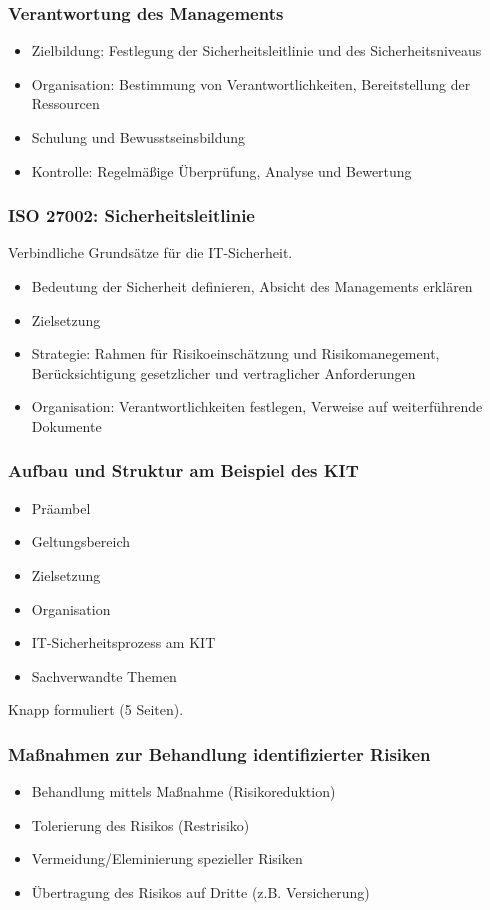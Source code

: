 \subsubsection{Verantwortung des Managements}
\begin{itemize}
	\item Zielbildung: Festlegung der Sicherheitsleitlinie und des Sicherheitsniveaus
	\item Organisation: Bestimmung von Verantwortlichkeiten, Bereitstellung der Ressourcen
	\item Schulung und Bewusstseinsbildung
	\item Kontrolle: Regelmäßige Überprüfung, Analyse und Bewertung
\end{itemize}

\subsubsection{ISO 27002: Sicherheitsleitlinie}
Verbindliche Grundsätze für die IT-Sicherheit.
\begin{itemize}
	\item Bedeutung der Sicherheit definieren, Absicht des Managements erklären
	\item Zielsetzung
	\item Strategie: Rahmen für Risikoeinschätzung und Risikomanegement, Berücksichtigung gesetzlicher und vertraglicher Anforderungen
	\item Organisation: Verantwortlichkeiten festlegen, Verweise auf weiterführende Dokumente
\end{itemize}

\subsubsection{Aufbau und Struktur am Beispiel des KIT}
\begin{itemize}
	\item Präambel
	\item Geltungsbereich
	\item Zielsetzung
	\item Organisation
	\item IT-Sicherheitsprozess am KIT
	\item Sachverwandte Themen
\end{itemize}
Knapp formuliert (5 Seiten).

\subsubsection{Maßnahmen zur Behandlung identifizierter Risiken}
\begin{itemize}
	\item Behandlung mittels Maßnahme (Risikoreduktion)
	\item Tolerierung des Risikos (Restrisiko)
	\item Vermeidung/Eleminierung spezieller Risiken
	\item Übertragung des Risikos auf Dritte (z.B. Versicherung)
\end{itemize}


